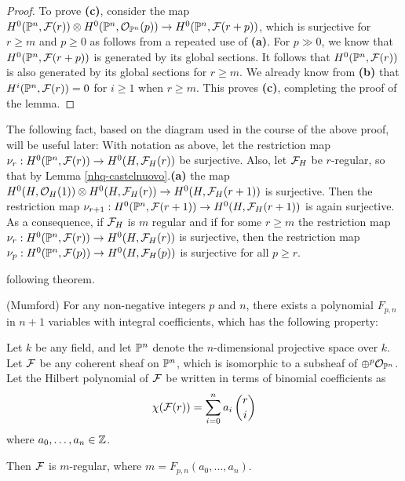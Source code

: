 \begin{proof}
To prove \textbf{(c)}, consider the map $H^0(\mathbb{P}^n, \mathcal{F}(r))
\otimes H^0(\mathbb{P}^n,{\mathcal O}_{\mathbb{P}^n}(p)) \to
H^0(\mathbb{P}^n, \mathcal{F}(r+p))$,
which is
surjective for $r\ge m$ and $p\ge 0$ as follows from
a repeated use of \textbf{(a)}.
For $p\gg 0$, we know that
$H^0(\mathbb{P}^n, \mathcal{F}(r+p))$ is generated by its global sections.
It follows that $H^0(\mathbb{P}^n, \mathcal{F}(r))$ is also generated
by its global sections for $r\ge m$. We already know from \textbf{(b)}
that $H^i(\mathbb{P}^n, \mathcal{F}(r))=0$ for $i\ge 1$ when $r\ge m$.
This proves \textbf{(c)}, completing the proof of the lemma.
\end{proof}


\begin{remark}\label{nhq-surjectivity-of-restriction}
The following fact, based on the
diagram used in the course of the above proof,
will be useful later: With notation as above,
let the restriction map
$\nu_r: H^0(\mathbb{P}^n, \mathcal{F}(r)) \to
H^0(H, \mathcal{F}_H(r))$ be surjective. Also, let $\mathcal{F}_H$ be $r$-regular, so that
by Lemma \ref{nhq-castelnuovo}.\textbf{(a)} the map
$H^0(H, {\mathcal O}_H(1))\otimes H^0(H, \mathcal{F}_H(r))\to H^0(H, \mathcal{F}_H(r+1))$
is surjective. Then the restriction map
$\nu_{r+1} : H^0(\mathbb{P}^n, \mathcal{F}(r+1)) \to  H^0(H, \mathcal{F}_H(r+1))$
is again surjective. As a consequence, if
$\mathcal{F}_H$ is $m$ regular and if for some $r \ge m$ the
restriction map $\nu_r : H^0(\mathbb{P}^n, \mathcal{F}(r)) \to
H^0(H, \mathcal{F}_H(r))$ is surjective, then the restriction map
$\nu_p : H^0(\mathbb{P}^n, \mathcal{F}(p)) \to
H^0(H, \mathcal{F}_H(p))$ is surjective for all $p\ge r$.










\end{remark}
\medskip

following theorem.

\begin{theorem}\label{nhq-mumford} {\rm (Mumford)}
For any non-negative integers $p$ and $n$,
there exists a polynomial $F_{p,n}$ in $n+1$ variables
with integral coefficients, which has the following property:

Let $k$ be any field, and let $\mathbb{P}^n$ denote the $n$-dimensional
projective space over $k$. Let
$\mathcal{F}$ be any coherent sheaf
on $\mathbb{P}^n$, which is isomorphic to a
subsheaf of $\oplus ^p{\mathcal O}_{\mathbb{P}^n}$.
Let the Hilbert polynomial of $\mathcal{F}$ be written in terms of binomial
coefficients as
$$\chi(\mathcal{F}(r)) = \sum_{i=0}^n a_i \, {r\choose i}$$
where $a_0,\ldots,a_n \in \mathbb{Z}$.

Then $\mathcal{F}$ is $m$-regular, where %
$m=F_{p,n}(a_0,\ldots,a_n)$.
\end{theorem}

